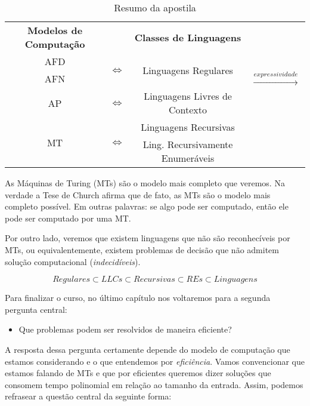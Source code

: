 \begin{table}[htbp]
  \centering
  \begin{tabular}{|ccc|c|}
    \hline
    {\bf Modelos de Computação} && {\bf Classes de Linguagens} & \multirow{5}{*}{\begin{turn}{-90}$\xrightarrow{expressividade}$\end{turn}}\\
    \cline{1-3}
    AFD & \multirow{2}{*}{$\Leftrightarrow$} & \multirow{2}{*}{Linguagens Regulares}& \\
    AFN  &&&\\
    \cline{1-3}
    AP & $\Leftrightarrow$ & Linguagens Livres de Contexto &\\
    \cline{1-3}
    \multirow{2}{*}{MT} & \multirow{2}{*}{$\Leftrightarrow$} & Linguagens Recursivas &\\
    & & Ling. Recursivamente Enumeráveis &\\
    \hline
  \end{tabular}
  \caption{Resumo da apostila}
  \label{tab:resumo}
\end{table}


As Máquinas de Turing (MTs) são o modelo mais completo que veremos.
Na verdade a Tese de Church afirma que de fato, as MTs são o modelo mais completo possível.
Em outras palavras: se algo pode ser computado, então ele pode ser computado por uma MT.

Por outro lado, veremos que existem linguagens que não são reconhecíveis por MTs, ou equivalentemente, existem problemas de decisão que não admitem solução computacional ({\em indecidíveis}).

\begin{displaymath}
  Regulares \subset LLCs \subset Recursivas \subset REs \subset Linguagens  
\end{displaymath}


Para finalizar o curso, no último capítulo nos voltaremos para a segunda pergunta central:
\begin{itemize}
\item Que problemas podem ser resolvidos de maneira eficiente?
\end{itemize}

A resposta dessa pergunta certamente depende do modelo de computação que estamos considerando e o que entendemos por {\em eficiência}.
Vamos convencionar que estamos falando de MTs e que por eficientes queremos dizer soluções que consomem tempo polinomial em relação ao tamanho da entrada.
Assim, podemos refrasear a questão central da seguinte forma:

